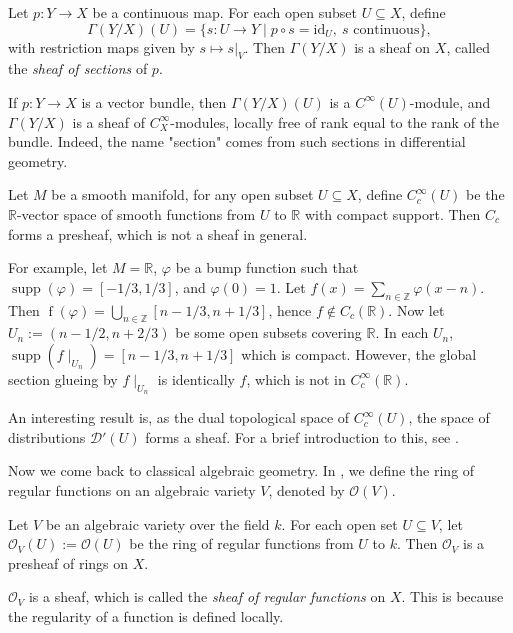\documentclass[11pt]{article}
\begin{document}
\begin{example}
Let \(p:Y\to X\) be a continuous map. For each open subset \(U\subseteq X\),
define
\[
\Gamma(Y/X)(U)=\{s:U\to Y \mid p\circ s=\mathrm{id}_U,\ s\text{ continuous}\},
\]
with restriction maps given by \(s\mapsto s|_V\). Then \(\Gamma(Y/X)\) is a
sheaf on \(X\), called the \emph{sheaf of sections} of \(p\). 

If \(p: Y \to X\) is a vector bundle, then \(\Gamma(Y/X)(U)\) is a
\(C^\infty(U)\)-module, and \(\Gamma(Y/X)\) is a sheaf of
\(C^\infty_X\)-modules, locally free of rank equal to the rank of the bundle.
Indeed, the name "section" comes from such sections 
in differential geometry. 
    
\end{example}


\begin{example}
    Let $ M $ be a smooth manifold, for any open subset $ U \subseteq X $, 
    define $ C_{c}^{\infty}(U) $ be the $ \mathbb{R} $-vector space of 
    smooth functions from $ U $ to $ \mathbb{R} $ with compact support. 
    Then $ C_{c} $ forms a presheaf, which is not a sheaf in general. 

    For example, let $ M= \mathbb{R} $, 
    $ \varphi $ be a bump function such that 
    $ \operatorname{supp}(\varphi) = [-1/3,1/3]$, and 
    $ \varphi(0)=1 $. Let 
    $ f(x)= \sum_{n \in \mathbb{Z}} \varphi(x-n) $. 
    Then $ \operatorname{f}(\varphi) = \bigcup_{n \in \mathbb{Z}} [n-1/3,n+1/3] $, 
    hence $ f \notin C_{c}(\mathbb{R}) $. 
    Now let $ U_{n}:=(n-1/2,n+2/3) $ be some open subsets covering $ \mathbb{R} $. 
    In each $ U_{n} $, 
    $\operatorname{supp}(f \mid_{U_{n}})=[n-1/3,n+1/3]$ which is compact. 
    However, the global section glueing by $ f\mid_{U_{n}} $ 
    is identically $ f $, which is not in $ C_{c}^{\infty}(\mathbb{R})$. 

    An interesting result is, as the dual topological space of 
    $ C_{c}^{\infty}(U) $, the space of distributions 
    $ \mathcal{D}'(U) $ forms a sheaf. 
    For a brief introduction to this, see \cite[{4.5}]{wikiDistribution}.
\end{example}

Now we come back to classical algebraic geometry. 
In \cite[I.3]{hartsAG}, we define the ring of regular functions on 
an algebraic variety $ V $, denoted by $ \mathscr{O}(V) $. 

\begin{example}
    \cite[II.1.0.1]{hartsAG} 
    Let $ V $ be an algebraic variety over the field $ k $. 
    For each open set $ U \subseteq V $, let 
    $ \mathscr{O}_{V}(U):=\mathscr{O}(U) $ be the ring of regular 
    functions from $ U $ to $ k $. Then $ \mathscr{O}_{V} $ 
    is a presheaf of rings on $ X $. 
    
    $ \mathscr{O}_{V} $ is a sheaf, which is called 
    the \emph{sheaf of regular functions} on $ X $. 
    This is because the regularity of a function is defined locally. 
\end{example}
\end{document}
